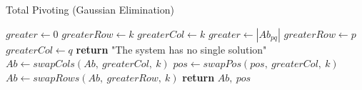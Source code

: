\documentclass{article}
\begin{document}
  \begin{algorithm}
    \caption{Total Pivoting (Gaussian Elimination)}
    \begin{algorithmic}[1]
        \State $greater \gets 0$
        \State $greaterRow \gets k$
        \State $greaterCol \gets k$
              \State $greater \gets |Ab_{pq}|$
              \State $greaterRow \gets p$
              \State $greaterCol \gets q$
            \EndIf
          \EndFor
        \EndFor
          \State \textbf{return} "The system has no single solution"
        \Else
            \State $Ab \gets swapCols(Ab,\ greaterCol,\ k)$
            \State $pos \gets swapPos(pos,\ greaterCol,\ k)$
          \EndIf
            \State $Ab \gets swapRows(Ab,\ greaterRow,\ k)$
          \EndIf
          \State \textbf{return} $Ab,\ pos$
        \EndIf
      \EndProcedure
    \end{algorithmic}
  \end{algorithm}
\end{document}
